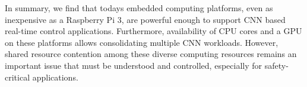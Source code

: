 

In summary, we find that todays embedded computing platforms, even as
inexpensive as a Raspberry Pi 3, are powerful enough to support
CNN based real-time control applications. Furthermore, availability of
CPU cores and a GPU on these platforms allows consolidating multiple CNN
workloads. However, shared resource contention among these diverse
computing resources remains an important issue that must be understood
and controlled, especially for safety-critical applications.
